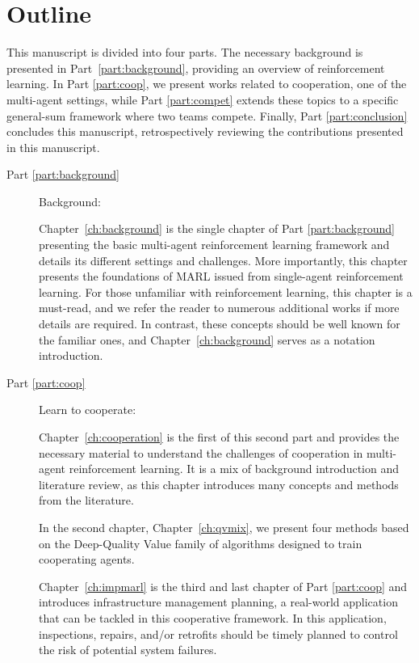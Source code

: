 \section{Outline}
\label{sec:ch1_outline}
This manuscript is divided into four parts.
The necessary background is presented in Part~\ref{part:background}, providing an overview of reinforcement learning.
In Part \ref{part:coop}, we present works related to cooperation, one of the multi-agent settings, while Part \ref{part:compet} extends these topics to a specific general-sum framework where two teams compete.
Finally, Part \ref{part:conclusion} concludes this manuscript, retrospectively reviewing the contributions presented in this manuscript.

\begin{description}
    \item [Part \ref{part:background}] Background:
    
    Chapter~\ref{ch:background} is the single chapter of Part \ref{part:background} presenting the basic multi-agent reinforcement learning framework and details its different settings and challenges.
    More importantly, this chapter presents the foundations of MARL issued from single-agent reinforcement learning.
    For those unfamiliar with reinforcement learning, this chapter is a must-read, and we refer the reader to numerous additional works if more details are required.
    In contrast, these concepts should be well known for the familiar ones, and Chapter~\ref{ch:background} serves as a notation introduction.

    \item [Part \ref{part:coop}] Learn to cooperate:
    
    Chapter~\ref{ch:cooperation} is the first of this second part and provides the necessary material to understand the challenges of cooperation in multi-agent reinforcement learning.
    It is a mix of background introduction and literature review, as this chapter introduces many concepts and methods from the literature.
    
    In the second chapter, Chapter~\ref{ch:qvmix}, we present four methods based on the Deep-Quality Value family of algorithms designed to train cooperating agents.
    
    Chapter~\ref{ch:impmarl} is the third and last chapter of Part \ref{part:coop} and introduces infrastructure management planning, a real-world application that can be tackled in this cooperative framework.
    In this application, inspections, repairs, and/or retrofits should be timely planned to control the risk of potential system failures.
    

\end{description}
